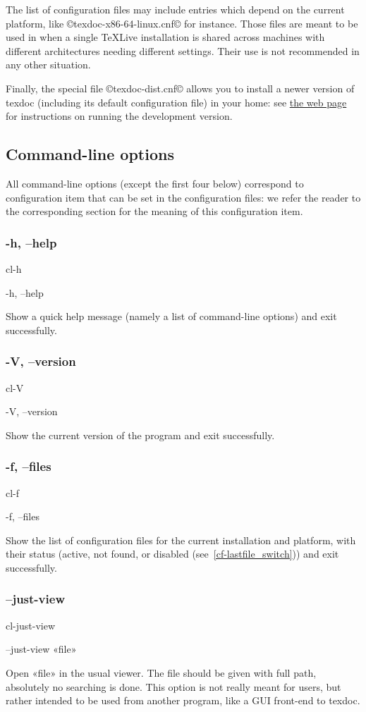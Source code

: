 \documentclass[a4paper, oneside]{scrartcl}
\newcommand\texlive{%
  \TeX\thinspace Live\xspace}
\newif\ifframed
\newenvironment{cmdsubsub}[2]{%
  \framedfalse \commandes\subsubsection{#1}{#2}%
  }{%
  \endcommandes}
\begin{document}
The list of configuration files may include entries which depend on the
current platform, like ©texdoc-x86-64-linux.cnf© for instance. Those files are
meant to be used in when a single \texlive installation is shared across
machines with different architectures needing different settings. Their use is
not recommended in any other situation.

Finally, the special file ©texdoc-dist.cnf© allows you to install a newer
version of texdoc (including its default configuration file) in your home:
see \href{http://tug.org/texdoc/dev/}{the web page} for instructions on
running the development version.

\subsection{Command-line options}\label{ss-cl}

All command-line options (except the first four below) correspond to
configuration item that can be set in the configuration files: we refer
the reader to the corresponding section for the meaning of this configuration
item.

\begin{cmdsubsub}{-h, --help}{cl-h}
  -h, --help
\end{cmdsubsub}

Show a quick help message (namely a list of command-line options) and exit
successfully.

\begin{cmdsubsub}{-V, --version}{cl-V}
  -V, --version
\end{cmdsubsub}

Show the current version of the program and exit successfully.

\begin{cmdsubsub}{-f, --files}{cl-f}
  -f, --files
\end{cmdsubsub}

Show the list of configuration files for the current installation and
platform, with their status (active, not found, or disabled
(see~\ref{cf-lastfile_switch})) and exit successfully.

\begin{cmdsubsub}{--just-view}{cl-just-view}
  --just-view «file»
\end{cmdsubsub}

Open «file» in the usual viewer. The file should be given with full path,
absolutely no searching is done. This option is not really meant for users,
but rather intended to be used from another program, like a GUI front-end to
texdoc.
\end{document}
